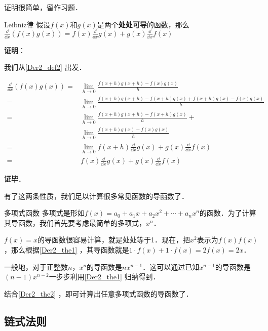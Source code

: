 证明很简单，留作习题．

\begin{theorem}{Leibniz律}\label{Der2_the1}
假设$f(x)$和$g(x)$是两个\textbf{处处可导}的函数，那么$\frac{\dd}{\dd x}(f(x)g(x))=f(x)\frac{\dd}{\dd x}g(x)+g(x)\frac{\dd}{\dd x}f(x)$
\end{theorem}

\textbf{证明}：

我们从\autoref{Der2_def2} 出发．

\begin{equation}
\begin{aligned}
\frac{\dd}{\dd x}(f(x)g(x))=&\lim\limits_{h\to 0}\frac{f(x+h)g(x+h)-f(x)g(x)}{h}\\
=&\lim\limits_{h\to 0}\frac{f(x+h)g(x+h)-f(x+h)g(x)+f(x+h)g(x)-f(x)g(x)}{h}\\
=&\lim\limits_{h\to 0}\frac{f(x+h)g(x+h)-f(x+h)g(x)}{h}+\\&\lim\limits_{h\to 0}\frac{f(x+h)g(x)-f(x)g(x)}{h}\\
=&\lim\limits_{h\to 0}f(x+h)\frac{\dd}{\dd x}g(x)+g(x)\frac{\dd}{\dd x}f(x)\\
=&f(x)\frac{\dd}{\dd x}g(x)+g(x)\frac{\dd}{\dd x}f(x)
\end{aligned}
\end{equation}

\textbf{证毕}．

有了这两条性质，我们足以计算很多常见函数的导函数了．

\begin{example}{多项式函数}
多项式是形如$f(x)=a_0+a_1x+a_2x^2+\cdots+a_nx^n$的函数．为了计算其导函数，我们首先要考虑最简单的多项式，$x^n$．

$f(x)=x$的导函数很容易计算，就是处处等于1．现在，把$x^2$表示为$f(x)f(x)$，那么根据\autoref{Der2_the1} ，其导函数就是$1\cdot f(x)+1\cdot f(x)=2f(x)=2x$．

一般地，对于正整数$n$，$x^n$的导函数是$nx^{n-1}$．这可以通过已知$x^{n-1}$的导函数是$(n-1)x^{n-2}$一步步利用\autoref{Der2_the1} 归纳得到．

结合\autoref{Der2_the2} ，即可计算出任意多项式函数的导函数了．
\end{example}


\subsection{链式法则}













